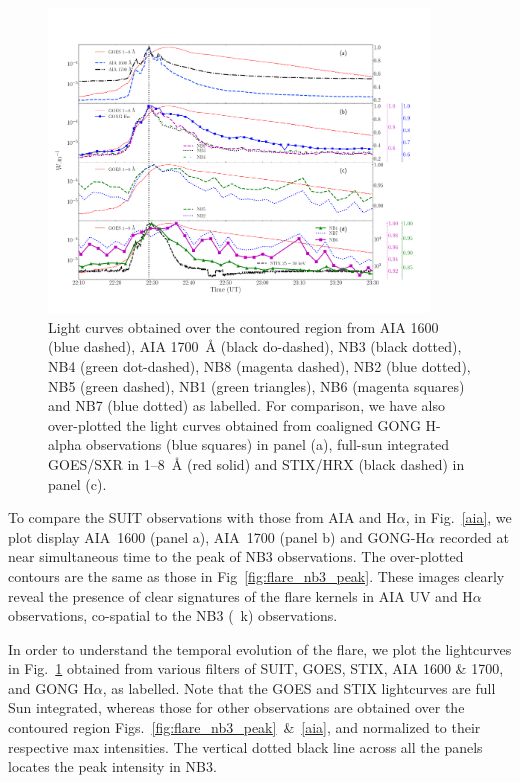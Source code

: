 \begin{figure}
    \centering
    \includegraphics[width=0.9\textwidth,trim={1cm 2cm 1cm 4.2cm},clip]{Figures/feb_22nd/lc_4.pdf}
    \caption[Comparison of SUIT NB lightcurve with other observatories]{Light curves obtained over the contoured region from AIA 1600 (blue dashed), AIA 1700~{\AA} (black do-dashed), NB3 (black dotted), NB4 (green dot-dashed), NB8 (magenta dashed), NB2 (blue dotted), NB5 (green dashed), NB1 (green triangles), NB6 (magenta squares) and NB7 (blue dotted) as labelled. For comparison, we have also over-plotted the light curves obtained from coaligned GONG H-alpha observations (blue squares) in panel (a), full-sun integrated GOES/SXR in 1{--}8~{\AA} (red solid) and STIX/HRX (black dashed) in panel (c).}
    \label{fig:flare_lc_suit}
\end{figure}

To compare the SUIT observations with those from AIA and H$\alpha$, in Fig.~\ref{aia}, we plot display AIA~1600 (panel a), AIA~1700 (panel b) and GONG-H$\alpha$ recorded at near simultaneous time to the peak of NB3 observations. The over-plotted contours are the same as those in Fig~\ref{fig:flare_nb3_peak}. These images clearly reveal the presence of clear signatures of the flare kernels in AIA UV and H$\alpha$ observations, co-spatial to the NB3 (~k) observations.

In order to understand the temporal evolution of the flare, we plot the lightcurves in Fig.~\ref{fig:flare_lc_suit} obtained from various filters of SUIT, GOES, STIX, AIA 1600 \& 1700, and GONG H$\alpha$, as labelled. Note that the GOES and STIX lightcurves are full Sun integrated, whereas those for other observations are obtained over the contoured region Figs.~\ref{fig:flare_nb3_peak}~\&~\ref{aia}, and normalized to their respective max intensities. The vertical dotted black line across all the panels locates the peak intensity in NB3. 

